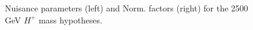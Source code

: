 \begin{figure}[H]
  \centering
  \caption{Nuisance parameters (left) and Norm. factors (right) for the 2500 GeV $H^{+}$ mass hypotheses.}
  \label{fig:Prefit_Hp2500_Blind}
\end{figure}
